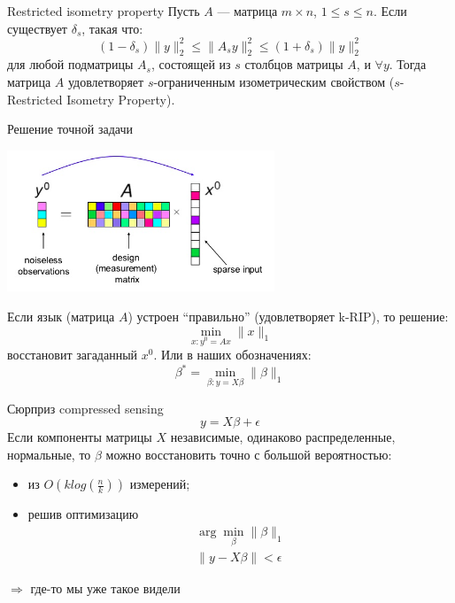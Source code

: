\documentclass[14pt, fleqn, xcolor={dvipsnames, table}]{beamer}
\begin{document}
\begin{frame}{Restricted isometry property}
Пусть $A$ --- матрица $m\times n$, $1 \le s \le n$. Если существует $\delta_s$, такая что:
$$
(1-\delta_s)\|y\|^2_2 \le \|A_sy\|^2_2 \le (1+\delta_s)\|y\|^2_2
$$
для любой подматрицы $A_s$, состоящей из $s$ столбцов матрицы $A$, и $\forall y$. Тогда матрица $A$ удовлетворяет $s$-ограниченным изометрическим свойством ($s$-Restricted Isometry Property).
\end{frame}

\begin{frame}{Решение точной задачи}
\begin{center}
\includegraphics[width=0.6\textwidth]{CS-ProblemSetup-1.png}
\end{center}
\vspace{-1em}

\small
Если язык (матрица $A$) устроен ``правильно'' (удовлетворяет k-RIP), то решение:
$$
\min_{x : y^0 = A x} \|x\|_1 
$$
восстановит загаданный $x^0$. Или в наших обозначениях:
$$
\beta^* = \min_{\beta : y = X \beta} \|\beta\|_1
$$
\end{frame}

\begin{frame}{Сюрприз compressed sensing}
\small
$$
y = X\beta + \epsilon
$$
Если компоненты матрицы $X$ независимые, одинаково распределенные, нормальные, то $\beta$ можно восстановить точно с большой вероятностью:
\begin{itemize}
  \item из $O(k log(\frac{n}{k}))$ измерений;
  \item решив оптимизацию
    $$\begin{array}{l}
    \arg \min_\beta\|\beta\|_1\\
    \|y - X\beta\| < \epsilon
    \end{array}$$
\end{itemize}
$\Rightarrow$ где-то мы уже такое видели
\end{frame}
\end{document}
